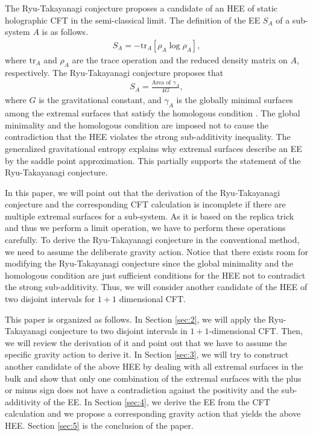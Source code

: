 \documentclass[%
 reprint,
 amsmath,amssymb,
 aps,
]{revtex4-2}
\begin{document}
    The Ryu-Takayanagi conjecture \cite{Ryu:2006bv,Ryu:2006ef} proposes a candidate of an HEE of static holographic CFT in the semi-classical limit. The definition of the EE $S_A$ of a sub-system $A$ is as follows.
\begin{align}\label{eq:def_of_EE}
    S_A = -\mathrm{tr}_A \left[ \rho_A \log \rho_A \right],
\end{align}
    where $\mathrm{tr}_A$ and $\rho_A$ are the trace operation and the reduced density matrix on $A$, respectively. The Ryu-Takayanagi conjecture proposes that
\begin{align}
    S_A = \frac{\text{Area of }\gamma_A}{4G},
\end{align}
    where $G$ is the gravitational constant, and $\gamma_A$ is the globally minimal surfaces among the extremal surfaces that satisfy the homologous condition \cite{Headrick:2007km}. The global minimality and the homologous condition are imposed not to cause the contradiction that the HEE violates the strong sub-additivity inequality. The generalized gravitational entropy \cite{Lewkowycz:2013nqa} explains why extremal surfaces describe an EE by the saddle point approximation. This partially supports the statement of the Ryu-Takayanagi conjecture.


    In this paper, we will point out that the derivation of the Ryu-Takayanagi conjecture and the corresponding CFT calculation is incomplete if there are multiple extremal surfaces for a sub-system. As it is based on the replica trick and thus we perform a limit operation, we have to perform these operations carefully. To derive the Ryu-Takayanagi conjecture in the conventional method, we need to assume the deliberate gravity action. Notice that there exists room for modifying the Ryu-Takayanagi conjecture since the global minimality and the homologous condition are just sufficient conditions for the HEE not to contradict the strong sub-additivity. Thus, we will consider another candidate of the HEE of two disjoint intervals for $1+1$ dimensional CFT. 


    This paper is organized as follows. In Section \ref{sec:2}, we will apply the Ryu-Takayanagi conjecture to two disjoint intervals in $1+1$-dimensional CFT. Then, we will review the derivation of it and point out that we have to assume the specific gravity action to derive it. In Section \ref{sec:3}, we will try to construct another candidate of the above HEE by dealing with all extremal surfaces in the bulk and show that only one combination of the extremal surfaces with the plus or minus sign does not have a contradiction against the positivity and the sub-additivity of the EE. In Section \ref{sec:4}, we derive the EE from the CFT calculation and we propose a corresponding gravity action that yields the above HEE. Section \ref{sec:5} is the conclusion of the paper. 
\end{document}

